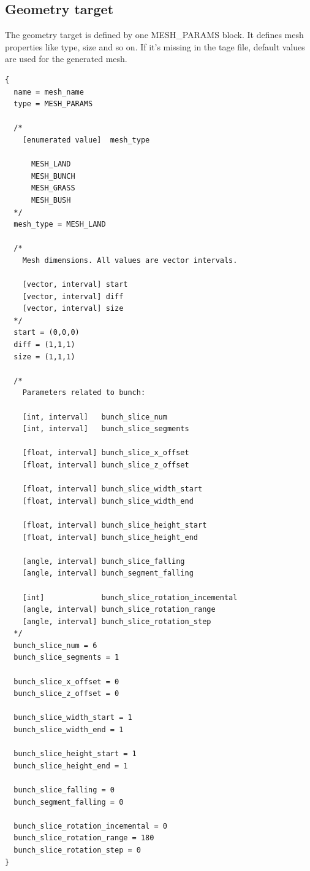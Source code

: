 \documentclass[9pt]{article}
\begin{document}
\subsection{Geometry target}

The geometry target is defined by one MESH\_PARAMS block. It defines 
mesh properties like type, size and so on. If it's missing in the 
tage file, default values are used for the generated mesh.

\begin{verbatim}
{
  name = mesh_name
  type = MESH_PARAMS

  /*
    [enumerated value]  mesh_type
   
      MESH_LAND
      MESH_BUNCH
      MESH_GRASS
      MESH_BUSH
  */
  mesh_type = MESH_LAND
  
  /*
    Mesh dimensions. All values are vector intervals.
  
    [vector, interval] start
    [vector, interval] diff
    [vector, interval] size
  */  
  start = (0,0,0)
  diff = (1,1,1)
  size = (1,1,1)
  
  /*
    Parameters related to bunch:
    
    [int, interval]   bunch_slice_num
    [int, interval]   bunch_slice_segments
      
    [float, interval] bunch_slice_x_offset
    [float, interval] bunch_slice_z_offset

    [float, interval] bunch_slice_width_start
    [float, interval] bunch_slice_width_end
    
    [float, interval] bunch_slice_height_start
    [float, interval] bunch_slice_height_end

    [angle, interval] bunch_slice_falling
    [angle, interval] bunch_segment_falling
        
    [int]             bunch_slice_rotation_incemental
    [angle, interval] bunch_slice_rotation_range
    [angle, interval] bunch_slice_rotation_step
  */    
  bunch_slice_num = 6
  bunch_slice_segments = 1
  
  bunch_slice_x_offset = 0
  bunch_slice_z_offset = 0
  
  bunch_slice_width_start = 1
  bunch_slice_width_end = 1
  
  bunch_slice_height_start = 1
  bunch_slice_height_end = 1
  
  bunch_slice_falling = 0
  bunch_segment_falling = 0
  
  bunch_slice_rotation_incemental = 0
  bunch_slice_rotation_range = 180
  bunch_slice_rotation_step = 0
}
\end{verbatim}
\end{document}
